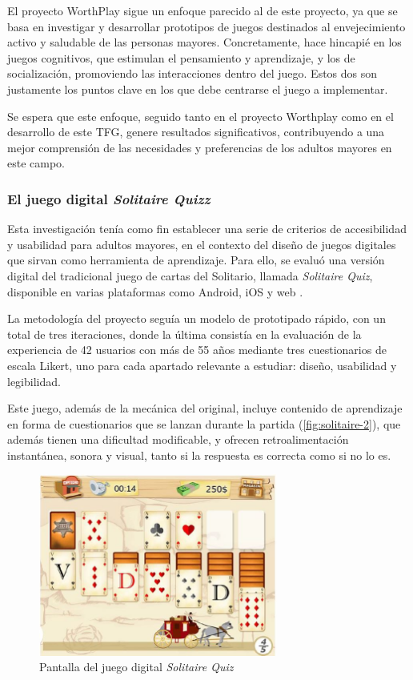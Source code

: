 El proyecto WorthPlay sigue un enfoque parecido al de este proyecto, ya que se basa en investigar y desarrollar prototipos de juegos destinados al envejecimiento activo y saludable de las personas mayores. Concretamente, hace hincapié en los juegos cognitivos, que estimulan el pensamiento y aprendizaje, y los de socialización, promoviendo las interacciones dentro del juego. Estos dos son justamente los puntos clave en los que debe centrarse el juego a implementar.

Se espera que este enfoque, seguido tanto en el proyecto Worthplay como en el desarrollo de este TFG, genere resultados significativos, contribuyendo a una mejor comprensión de las necesidades y preferencias de los adultos mayores en este campo.

\subsubsection{El juego digital \textit{Solitaire Quizz}}

Esta investigación tenía como fin establecer una serie de criterios de accesibilidad y usabilidad para adultos mayores, en el contexto del diseño de juegos digitales que sirvan como herramienta de aprendizaje. Para ello, se evaluó una versión digital del tradicional juego de cartas del Solitario, llamada \textit{Solitaire Quiz}, disponible en varias plataformas como Android, iOS y web \parencite{diseño2017}.

La metodología del proyecto seguía un modelo de prototipado rápido, con un total de tres iteraciones, donde la última consistía en la evaluación de la experiencia de 42 usuarios con más de 55 años mediante tres cuestionarios de escala Likert, uno para cada apartado relevante a estudiar: diseño, usabilidad y legibilidad.

Este juego, además de la mecánica del original, incluye contenido de aprendizaje en forma de cuestionarios que se lanzan durante la partida (\autoref{fig:solitaire-2}), que además tienen una dificultad modificable, y ofrecen retroalimentación instantánea, sonora y visual, tanto si la respuesta es correcta como si no lo es.

\begin{figure}[H]
	\centering
	\includegraphics[width=0.7\textwidth]{imgs/solitaire-1.JPG}
	\caption{Pantalla del juego digital \textit{Solitaire Quiz}}
	\label{fig:solitaire-1}
\end{figure}

